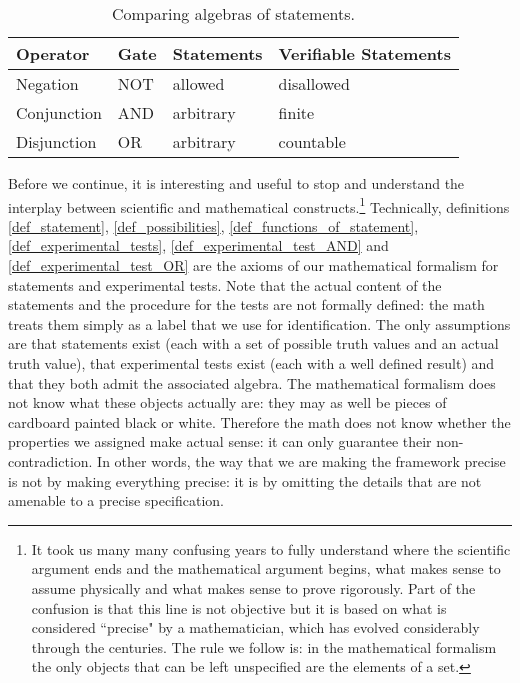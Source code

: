 \documentclass[11pt,letterpaper,fleqn]{memoir} %
\begin{document}
\begin{table}[h]
	\centering
\begin{tabular}{p{} p{} p{} p{}}
	Operator & Gate & Statements & Verifiable Statements \\ 
	\hline 
	Negation & NOT & allowed & disallowed \\ 
	Conjunction & AND & arbitrary  & finite \\ 
	Disjunction & OR & arbitrary  & countable \\ 
\end{tabular}
	\caption{Comparing algebras of statements.}
\end{table}

Before we continue, it is interesting and useful to stop and understand the interplay between scientific and mathematical constructs.\footnote{It took us many many confusing years to fully understand where the scientific argument ends and the mathematical argument begins, what makes sense to assume physically and what makes sense to prove rigorously. Part of the confusion is that this line is not objective but it is based on what is considered ``precise" by a mathematician, which has evolved considerably through the centuries. The rule we follow is: in the mathematical formalism the only objects that can be left unspecified are the elements of a set.} Technically, definitions \ref{def_statement}, \ref{def_possibilities}, \ref{def_functions_of_statement}, \ref{def_experimental_tests}, \ref{def_experimental_test_AND} and \ref{def_experimental_test_OR} are the axioms of our mathematical formalism for statements and experimental tests. Note that the actual content of the statements and the procedure for the tests are not formally defined: the math treats them simply as a label that we use for identification. The only assumptions are that statements exist (each with a set of possible truth values and an actual truth value), that experimental tests exist (each with a well defined result) and that they both admit the associated algebra. The mathematical formalism does not know what these objects actually are: they may as well be pieces of cardboard painted black or white. Therefore the math does not know whether the properties we assigned make actual sense: it can only guarantee their non-contradiction. In other words, the way that we are making the framework precise is not by making everything precise: it is by omitting the details that are not amenable to a precise specification.
\end{document}
